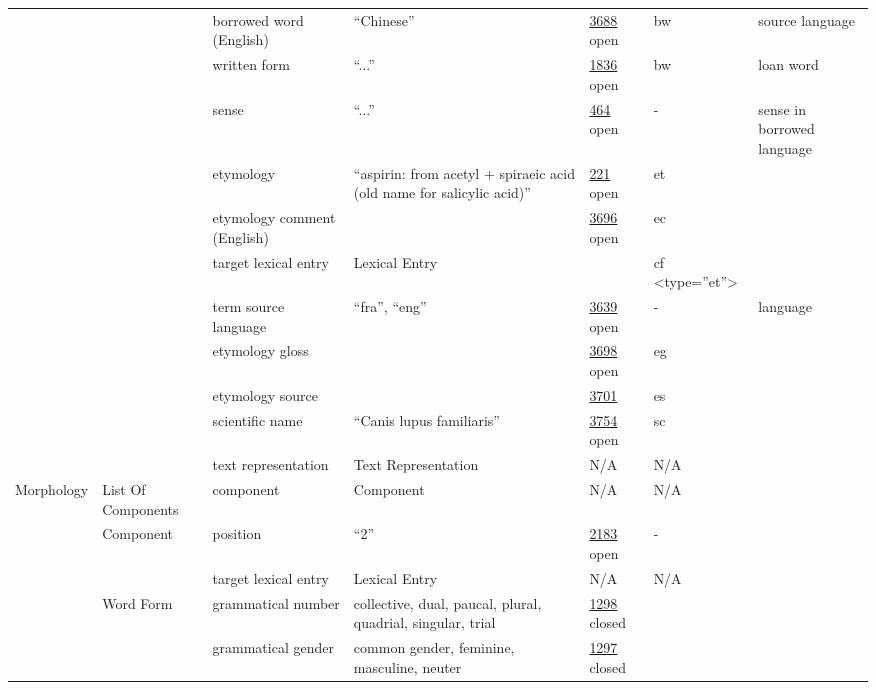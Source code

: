\documentclass[a4paper,12pt]{article}
\begin{document}
\begin{center}
\begin{longtable}{*7{p{2cm}}}
& & borrowed word (English) & ``Chinese'' & \href{http://www.isocat.org/datcat/DC-3688}{3688} open & bw & source language \\ \cmidrule{3-7}
& & written form & ``...'' & \href{http://www.isocat.org/datcat/DC-1836}{1836} open & bw & loan word \\ \cmidrule{3-7}
& & sense & ``...'' & \href{http://www.isocat.org/datcat/DC-464}{464} open & - & sense in borrowed language \\ \cmidrule{3-7}
& & etymology & ``aspirin: from acetyl + spiraeic acid (old name for salicylic acid)'' & \href{http://www.isocat.org/datcat/DC-221}{221} open & et & \\ \cmidrule{3-7}
& & etymology comment (English) & & \href{http://www.isocat.org/datcat/DC-3696}{3696} open & ec & \\ \cmidrule{3-7}
& & target lexical entry & Lexical Entry & & cf \textless type=''et''\textgreater & \\ \cmidrule{3-7}
& & term source language & ``fra'', ``eng'' & \href{http://www.isocat.org/datcat/DC-3639}{3639} open & - & language \\ \cmidrule{3-7}
& & etymology gloss & & \href{http://www.isocat.org/datcat/DC-3698}{3698} open & eg & \\ \cmidrule{3-7}
& & etymology source & & \href{http://www.isocat.org/datcat/DC-3701}{3701} & es & \\ \cmidrule{3-7}
& & scientific name & ``Canis lupus familiaris'' & \href{http://www.isocat.org/datcat/DC-3754}{3754} open & sc & \\ \cmidrule{3-7}
& & text representation & Text Re\-pre\-sen\-ta\-tion & N/A & N/A & \\ \cmidrule{1-7}
\multirow{18}{2cm}{Morphology} &List Of Components & component & Component & N/A & N/A & \\ \cmidrule{2-7}
& \multirow{2}{2cm}{Component} & position & ``2'' & \href{http://www.isocat.org/datcat/DC-2183}{2183} open & - & \\ \cmidrule{3-7}
& & target lexical entry & Lexical Entry & N/A & N/A & \\ \cmidrule{2-7}
& \multirow{10}{2cm}{Word Form} & grammatical number & collective, dual, paucal, plural, quadrial, singular, trial & \href{http://www.isocat.org/datcat/DC-1298}{1298} closed & & \\ \cmidrule{3-7}
& & grammatical gender & common gender, feminine, masculine, neuter & \href{http://www.isocat.org/datcat/DC-1297}{1297} closed & & \\ \cmidrule{3-7}

\end{longtable}
\end{center}
\end{document}
